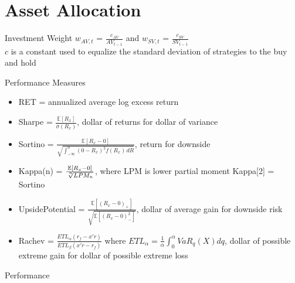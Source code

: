 \documentclass{beamer}
\begin{document}
\section{Asset Allocation}

\begin{frame}{Investment Weight}
	$w_{AV,t}$ = $\frac{c_{AV}}{AV_{t-1}}$ and $w_{SV,t}$ = $\frac{c_{SV}}{SV_{t-1}}$\\
	$c$ is a constant used to equalize the standard deviation of strategies to the buy and hold
	\begin{adjustbox}{width=\textwidth}
		
	\end{adjustbox}
	\begin{adjustbox}{width=\textwidth}
		
	\end{adjustbox}
\end{frame}

\begin{frame}{Performance Measures}
	\begin{itemize}
		\item RET = annualized average log excess return
		\item Sharpe = $\frac{\mathbb{E}[R_{x}]}{\sigma(R_{x})}$, dollar of returns for dollar of variance
		\item Sortino = $\frac{\mathbb{E}[R_{x} - 0]}{\sqrt  {\int _{{-\infty }}^{0}(0-R_{x})^{2}f(R_{x})\,dR}}$, return for downside
		\item Kappa(n) = $\frac{\mathbb{E}[R_{x} - 0]}{\sqrt[\leftroot{-2}\uproot{2}n]{LPM_{n}}}$, where LPM is lower partial moment Kappa[2] = Sortino
		\item UpsidePotential = $\frac {\mathbb {E} [(R_{x}-0)_{+}]}{\sqrt {\mathbb {E} [(R_{x}-0)_{-}^{2}]}}$, dollar of average gain for downside risk
		\item Rachev = $\frac {ET{L_{\alpha }}\left({{r_{f}}-x'r}\right)}{ET{L_{\beta }}\left({x'r-{r_{f}}}\right)}$ where $ET{L_{\alpha }}={\frac {1}{\alpha }}\int _{0}^{\alpha }{Va{R_{q}}\left(X\right)dq}$, dollar of possible extreme gain for dollar of possible extreme loss
	\end{itemize}
\end{frame}

\begin{frame}{Performance}
	\begin{adjustbox}{width=\textwidth}
		
	\end{adjustbox}
\end{frame}
\end{document}
